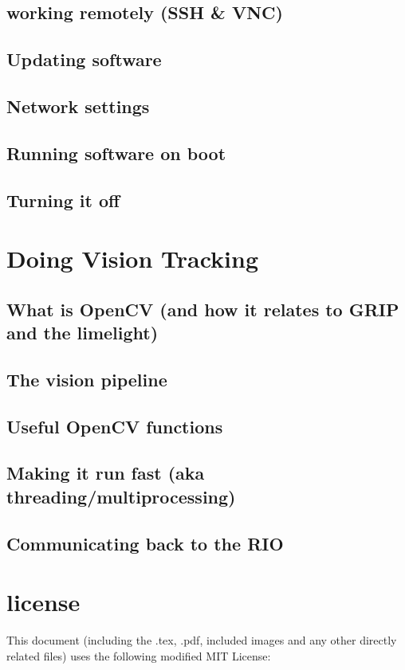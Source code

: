 \documentclass[11pt, titlepage]{article}
\begin{document}
\subsection{working remotely (SSH \& VNC)}
\subsection{Updating software}
\subsection{Network settings}
\subsection{Running software on boot}
\subsection{Turning it off}

\section{Doing Vision Tracking}
\subsection{What is OpenCV (and how it relates to GRIP and the limelight)}
\subsection{The vision pipeline}
\subsection{Useful OpenCV functions}
\subsection{Making it run fast (aka threading/multiprocessing)}
\subsection{Communicating back to the RIO}

	
\section{license}
This document (including the .tex, .pdf, included images and any other directly related files) uses the following modified MIT License:
\end{document}
